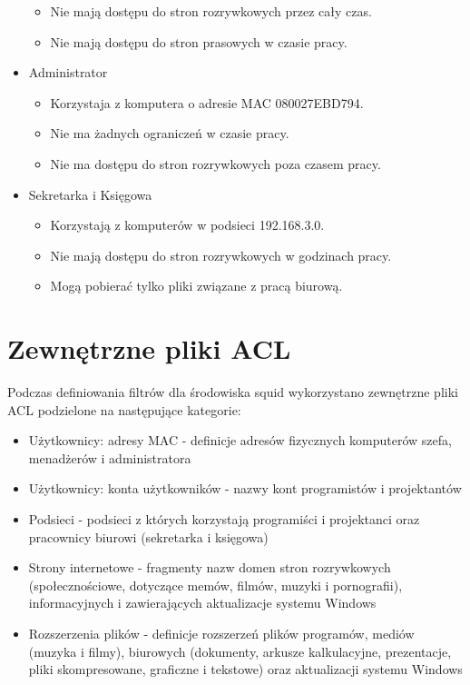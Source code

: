 \documentclass{article}
\begin{document}
\begin{itemize}
\begin{itemize}
        \item Nie mają dostępu do stron rozrywkowych przez cały czas.
        \item Nie mają dostępu do stron prasowych w czasie pracy.
    \end{itemize}
    \item Administrator
    \begin{itemize}
        \item Korzystaja z komputera o adresie MAC 080027EBD794.
        \item Nie ma żadnych ograniczeń w czasie pracy.
        \item Nie ma dostępu do stron rozrywkowych poza czasem pracy.
    \end{itemize}
    \item Sekretarka i Księgowa
    \begin{itemize}
        \item Korzystają z komputerów w podsieci 192.168.3.0.
        \item Nie mają dostępu do stron rozrywkowych w godzinach pracy.
        \item Mogą pobierać tylko pliki związane z pracą biurową.
    \end{itemize}
\end{itemize}

\section{Zewnętrzne pliki ACL}
Podczas definiowania filtrów dla środowiska squid wykorzystano zewnętrzne pliki ACL podzielone na następujące kategorie:
\begin{itemize}
    \item Użytkownicy: adresy MAC - definicje adresów fizycznych komputerów szefa, menadżerów i administratora
    \item Użytkownicy: konta użytkowników - nazwy kont programistów i projektantów
    \item Podsieci - podsieci z których korzystają programiści i projektanci oraz pracownicy biurowi (sekretarka i księgowa)
    \item Strony internetowe - fragmenty nazw domen stron rozrywkowych (społecznościowe, dotyczące memów, filmów, muzyki i pornografii), informacyjnych i zawierających aktualizacje systemu Windows
    \item Rozszerzenia plików - definicje rozszerzeń plików programów, mediów (muzyka i filmy), biurowych (dokumenty, arkusze kalkulacyjne, prezentacje, pliki skompresowane, graficzne i tekstowe) oraz aktualizacji systemu Windows
\end{itemize}
\end{document}
